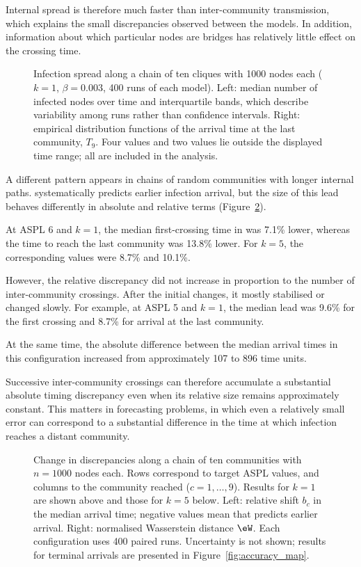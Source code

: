 Internal spread is therefore much faster than inter-community transmission, which explains the small discrepancies observed between the models. In addition, information about which particular nodes are bridges has relatively little effect on the crossing time.

\begin{figure}[tbp]
\centering
\caption{%
Infection spread along a chain of ten cliques with 1000 nodes each ($k=1$, $\beta=0.003$, 400 runs of each model).
Left: median number of infected nodes over time and interquartile bands, which describe variability among runs rather than confidence intervals.
Right: empirical distribution functions of the arrival time at the last community, $T_9$. Four \Full{} values and two \TS{} values lie outside the displayed time range; all are included in the analysis.
}
\label{fig:chain_cliques}
\end{figure}

A different pattern appears in chains of random communities with longer internal paths. \TS{} systematically predicts earlier infection arrival, but the size of this lead behaves differently in absolute and relative terms (Figure~\ref{fig:chain_heatmap}).

At ASPL 6 and $k=1$, the median first-crossing time in \TS{} was 7.1\% lower, whereas the time to reach the last community was 13.8\% lower. For $k=5$, the corresponding values were 8.7\% and 10.1\%.

However, the relative discrepancy did not increase in proportion to the number of inter-community crossings. After the initial changes, it mostly stabilised or changed slowly. For example, at ASPL 5 and $k=1$, the median lead was 9.6\% for the first crossing and 8.7\% for arrival at the last community.

At the same time, the absolute difference between the median arrival times in this configuration increased from approximately 107 to 896 time units.

Successive inter-community crossings can therefore accumulate a substantial absolute timing discrepancy even when its relative size remains approximately constant. This matters in forecasting problems, in which even a relatively small error can correspond to a substantial difference in the time at which infection reaches a distant community.

\begin{figure}[tbp]
\centering
\caption{%
Change in discrepancies along a chain of ten communities with $n=1000$ nodes each.
Rows correspond to target ASPL values, and columns to the community reached ($c=1,\ldots,9$).
Results for $k=1$ are shown above and those for $k=5$ below.
Left: relative shift $b_c$ in the median arrival time; negative values mean that \TS{} predicts earlier arrival.
Right: normalised Wasserstein distance $\eW$.
Each configuration uses 400 paired runs. Uncertainty is not shown; results for terminal arrivals are presented in Figure~\ref{fig:accuracy_map}.
}
\label{fig:chain_heatmap}
\end{figure}


